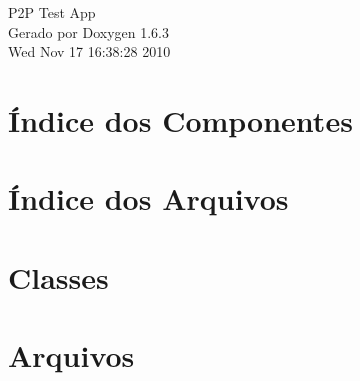\documentclass[a4paper]{book}
\begin{document}
\begin{titlepage}
\vspace*{7cm}
\begin{center}
{\Large P2P Test App }\\
\vspace*{1cm}
{\large Gerado por Doxygen 1.6.3}\\
\vspace*{0.5cm}
{\small Wed Nov 17 16:38:28 2010}\\
\end{center}
\end{titlepage}
\clearemptydoublepage
{}
\tableofcontents
\clearemptydoublepage
{}
\chapter{Índice dos Componentes}

\chapter{Índice dos Arquivos}

\chapter{Classes}



\chapter{Arquivos}






\printindex
\end{document}
